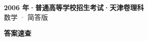 \documentclass[zihao=-4, a4paper]{ctexart}
\begin{document}
\begin{center}
  {\Large\bfseries 2006 年·普通高等学校招生考试·天津卷理科}\\[4pt]
  {\large 数学 · 简答版}
\end{center}
\medskip
{}

\clearpage
{}
\begin{center}{\Large\bfseries 答案速查}\end{center}
\medskip

\end{document}
